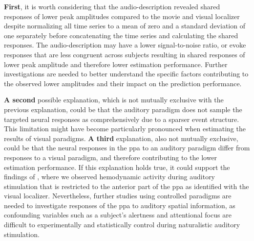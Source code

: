 \textbf{First}, it is worth considering that the audio-description revealed
shared responses of lower peak amplitudes compared to the movie and visual
localizer despite normalizing all time series to a mean of zero and a standard
deviation of one separately before concatenating the time series and calculating
the shared responses.
%
The audio-description may have a lower signal-to-noise ratio, or evoke responses that are less congruent across subjects resulting
in shared responses of lower peak amplitude and therefore lower estimation
performance.
%
Further investigations are needed to better understand the specific factors
contributing to the observed lower amplitudes and their impact on the prediction
performance.


%
\textbf{A second} possible explanation, which is not mutually exclusive with the
previous explanation, could be that the auditory paradigm does not sample the
targeted neural responses as comprehensively due to a sparser event structure.
%
This limitation might have become particularly pronounced when estimating the
results of visual paradigms.
%
\textbf{A third} explanation, also not mutually exclusive, could be that the
neural responses in the \ac{ppa} to an auditory paradigm differ from responses
to a visual paradigm, and therefore contributing to the lower estimation
performance.
%
If this explanation holds true, it could support the findings of
\citet{haeusler2022processing}, where we observed hemodynamic activity during
auditory stimulation that is restricted to the anterior part of the \ac{ppa} as
identified with the visual localizer.
%
Nevertheless, further studies using controlled paradigms are needed to
investigate responses of the \ac{ppa} to auditory spatial information, as
confounding variables such as a subject's alertness and attentional focus are
difficult to experimentally and statistically control during naturalistic
auditory stimulation.

